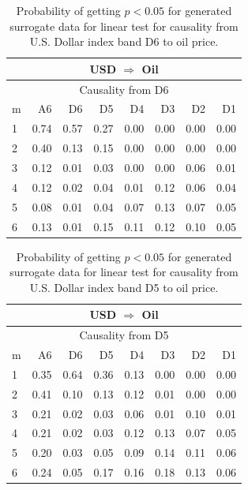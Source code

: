 %
%
\begin{table}[H]
\begin{center}
\begin{tabular}{l|r r r r r r r}
\hline\hline
\multicolumn{8}{c}{USD $\Rightarrow$ Oil}\\
\hline
\multicolumn{8}{c}{Causality from D6}\\
\hline\hline
m & A6 & D6 & D5 & D4 & D3 & D2 & D1 \\
\hline
1 & 0.74 & 0.57 & 0.27 & 0.00 & 0.00 & 0.00 & 0.00 \\
2 & 0.40 & 0.13 & 0.15 & 0.00 & 0.00 & 0.00 & 0.00 \\
3 & 0.12 & 0.01 & 0.03 & 0.00 & 0.00 & 0.06 & 0.01 \\
4 & 0.12 & 0.02 & 0.04 & 0.01 & 0.12 & 0.06 & 0.04 \\
5 & 0.08 & 0.01 & 0.04 & 0.07 & 0.13 & 0.07 & 0.05 \\
6 & 0.13 & 0.01 & 0.15 & 0.11 & 0.12 & 0.10 & 0.05 \\
\hline\hline
\end{tabular}
\caption{Probability of getting $p < 0.05$ for generated surrogate data for linear test for causality from U.S. Dollar index band D6 to oil price.}
\end{center}
\end{table}

%
%
\begin{table}[H]
\begin{center}
\begin{tabular}{l|r r r r r r r}
\hline\hline
\multicolumn{8}{c}{USD $\Rightarrow$ Oil}\\
\hline
\multicolumn{8}{c}{Causality from D5}\\
\hline\hline
m & A6 & D6 & D5 & D4 & D3 & D2 & D1 \\
\hline
1 & 0.35 & 0.64 & 0.36 & 0.13 & 0.00 & 0.00 & 0.00 \\
2 & 0.41 & 0.10 & 0.13 & 0.12 & 0.01 & 0.00 & 0.00 \\
3 & 0.21 & 0.02 & 0.03 & 0.06 & 0.01 & 0.10 & 0.01 \\
4 & 0.21 & 0.02 & 0.03 & 0.12 & 0.13 & 0.07 & 0.05 \\
5 & 0.20 & 0.03 & 0.05 & 0.09 & 0.14 & 0.11 & 0.06 \\
6 & 0.24 & 0.05 & 0.17 & 0.16 & 0.18 & 0.13 & 0.06 \\
\hline\hline
\end{tabular}
\caption{Probability of getting $p < 0.05$ for generated surrogate data for linear test for causality from U.S. Dollar index band D5 to oil price.}
\end{center}
\end{table}

